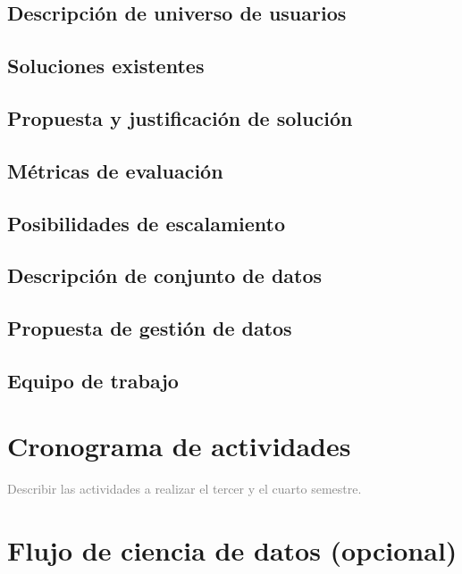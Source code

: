 \documentclass{amsart}
\begin{document}
\subsection*{Descripción de universo de  usuarios}

\subsection*{Soluciones existentes}  

\subsection*{Propuesta y justificación de solución}

\subsection*{Métricas de evaluación}

\subsection*{Posibilidades de escalamiento}

\subsection*{Descripción de conjunto de datos}

\subsection*{Propuesta de gestión de datos}

\subsection*{Equipo de trabajo}


\section{Cronograma de actividades}

\noindent \textcolor{gray}{Describir las actividades a realizar el tercer y el cuarto semestre.}

\section{Flujo de ciencia de datos (opcional)}
\end{document}
